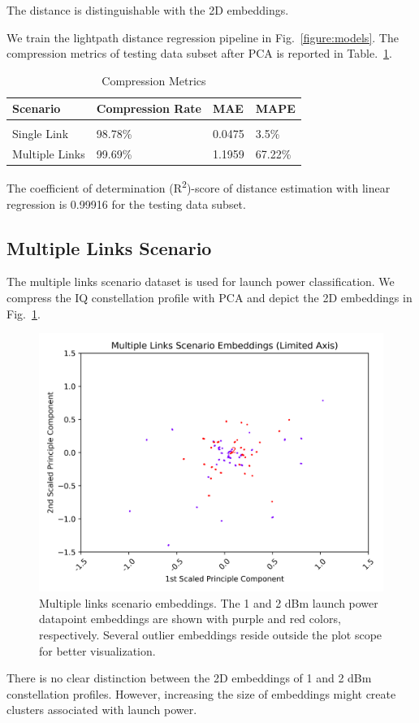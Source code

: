\documentclass[lettersize,journal, one-column]{IEEEtran}
\begin{document}
The distance is distinguishable with the 2D embeddings.

We train the lightpath distance regression pipeline in Fig.~\ref{figure:models}.
The compression metrics of testing data subset after PCA is reported in Table.~\ref{table:compression}.
\begin{table}
    \centering
    \caption{Compression Metrics}
    \begin{tabular}{l l l l}
        \hline
        \hline
        Scenario & Compression Rate & MAE & MAPE \\
		\hline \\
        Single Link & 98.78\% & 0.0475 & 3.5\% \\
        Multiple Links & 99.69\% & 1.1959 & 67.22\% \\
        \hline
    \end{tabular}
    \label{table:compression}
\end{table}

The coefficient of determination (R\textsuperscript{2})-score of distance estimation with linear regression is 0.99916 for the testing data subset.

\subsection{Multiple Links Scenario}
The multiple links scenario dataset is used for launch power classification.
We compress the IQ constellation profile with PCA and depict the 2D embeddings in Fig.~\ref{figure:multiple_whole}.
\begin{figure}
	\centering
    \includegraphics[width=\columnwidth]{figures/multiple_scenario_zoommed.png}
    \caption{Multiple links scenario embeddings. The 1 and 2 dBm launch power datapoint embeddings are shown with purple and red colors, respectively. Several outlier embeddings reside outside the plot scope for better visualization.}
	\label{figure:multiple_whole}
\end{figure}
There is no clear distinction between the 2D embeddings of 1 and 2 dBm constellation profiles.
However, increasing the size of embeddings might create clusters associated with launch power.
\end{document}
